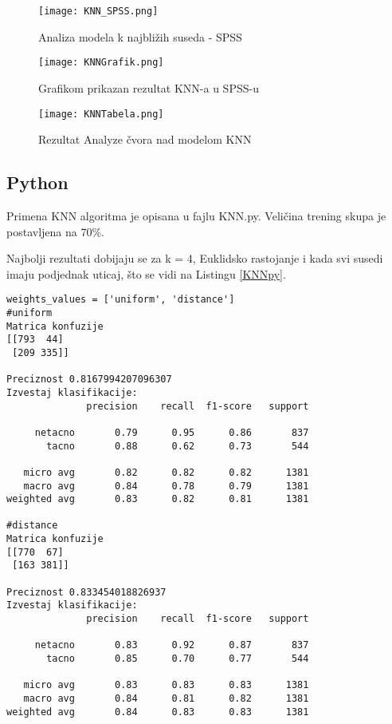 \documentclass[a4paper]{article}
\begin{document}
\begin{figure}[ht!]
    \centering
    \texttt{[image: KNN\_SPSS.png]}
    \caption{Analiza modela k najbližih suseda - SPSS}
    \label{fig:KNN_SPSS}
\end{figure}
\begin{figure}[ht!]
    \centering
    \texttt{[image: KNNGrafik.png]}
    \caption{Grafikom prikazan rezultat KNN-a u SPSS-u}
    \label{fig:KNNGrafik}
\end{figure}
\begin{figure}[ht!]
	\centering
    \texttt{[image: KNNTabela.png]}
    \caption{Rezultat Analyze čvora nad modelom KNN}
    \label{fig:KNNTabela}
\end{figure}            
            
\subsection{Python}

Primena KNN algoritma je opisana u fajlu KNN.py. Veličina trening skupa je postavljena na 70\%. 

Najbolji rezultati dobijaju se za k = 4, Euklidsko rastojanje i kada svi susedi imaju podjednak uticaj, što se vidi na Listingu \ref{KNNpy}.

\begin{lstlisting}[caption={Rezultat KNN-a},frame=single, label=KNNpy]
weights_values = ['uniform', 'distance']
#uniform
Matrica konfuzije
[[793  44]
 [209 335]]

Preciznost 0.8167994207096307
Izvestaj klasifikacije:
              precision    recall  f1-score   support

     netacno       0.79      0.95      0.86       837
       tacno       0.88      0.62      0.73       544

   micro avg       0.82      0.82      0.82      1381
   macro avg       0.84      0.78      0.79      1381
weighted avg       0.83      0.82      0.81      1381

#distance
Matrica konfuzije
[[770  67]
 [163 381]]

Preciznost 0.833454018826937
Izvestaj klasifikacije:
              precision    recall  f1-score   support

     netacno       0.83      0.92      0.87       837
       tacno       0.85      0.70      0.77       544

   micro avg       0.83      0.83      0.83      1381
   macro avg       0.84      0.81      0.82      1381
weighted avg       0.84      0.83      0.83      1381
\end{lstlisting} 
\end{document}
